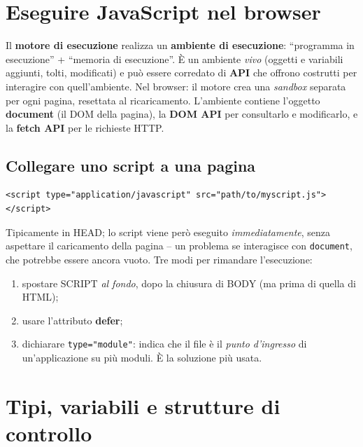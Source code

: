 \section{Eseguire JavaScript nel browser}

Il \textbf{motore di esecuzione} realizza un \textbf{ambiente di esecuzione}: ``programma in
esecuzione'' + ``memoria di esecuzione''. \`E un ambiente \emph{vivo} (oggetti e variabili
aggiunti, tolti, modificati) e pu\`o essere corredato di \textbf{API} che offrono costrutti
per interagire con quell'ambiente. Nel browser: il motore crea una \emph{sandbox} separata
per ogni pagina, resettata al ricaricamento. L'ambiente contiene l'oggetto \textbf{document}
(il DOM della pagina), la \textbf{DOM API} per consultarlo e modificarlo, e la
\textbf{fetch API} per le richieste HTTP.

\subsection{Collegare uno script a una pagina}
\begin{lstlisting}[language=HTMLCSS]
<script type="application/javascript" src="path/to/myscript.js"></script>
\end{lstlisting}
Tipicamente in HEAD; lo script viene per\`o eseguito \emph{immediatamente}, senza aspettare il
caricamento della pagina -- un problema se interagisce con \texttt{document}, che potrebbe
essere ancora vuoto. Tre modi per rimandare l'esecuzione:
\begin{enumerate}
  \item spostare SCRIPT \emph{al fondo}, dopo la chiusura di BODY (ma prima di quella di HTML);
  \item usare l'attributo \textbf{defer};
  \item dichiarare \texttt{type="module"}: indica che il file \`e il \emph{punto d'ingresso}
        di un'applicazione su pi\`u moduli. \`E la soluzione pi\`u usata.
\end{enumerate}

\section{Tipi, variabili e strutture di controllo}

